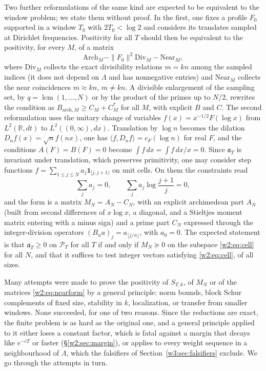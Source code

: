 \documentclass[11pt]{amsart}
\theoremstyle{definition}
\theoremstyle{remark}
\numberwithin{equation}{section}
\newcommand{\R}{\mathbb{R}}
\newcommand{\cF}{c_F}                                  %
\newcommand{\PT}{\mathcal{P}_T}                        %
\newcommand{\aT}{\mathfrak{a}_T}                       %
\begin{document}
Two further reformulations of the same kind are expected to be equivalent to the window problem; we state them without
proof. In the first, one fixes a profile $F_0$ supported in a window $T_0$ with $2T_0<\log2$ and considers its
translates sampled at Dirichlet frequencies. Positivity for all $T$ should then be equivalent to the positivity, for
every $M$, of a matrix
\begin{equation}\label{w2:eq:nearform}
\mathrm{Arch}_M-\|F_0\|^2\mathrm{Div}_M-\mathrm{Near}_M,
\end{equation}
where $\mathrm{Div}_M$ collects the exact divisibility relations $m=kn$ among the sampled indices (it does not depend
on $\Lambda$ and has nonnegative entries) and $\mathrm{Near}_M$ collects the near coincidences $m\approx kn$, $m\ne kn$.
A divisible enlargement of the sampling set, by $q=\operatorname{lcm}(1,\dots,N)$ or by the product of the primes up
to $N/2$, rewrites the condition as $B_{\mathrm{arch},M}\ge C_M+C_M^*$ for all $M$, with explicit $B$ and $C$. The
second reformulation uses the unitary change of variables $f(x)=x^{-1/2}F(\log x)$ from $L^2(\R,dt)$ to
$L^2((0,\infty),dx)$. Translation by $\log n$ becomes the dilation $D_nf(x)=\sqrt nf(nx)$, one has
$\langle f,D_nf\rangle=\cF(\log n)$ for real $F$, and the conditions $A(F)=B(F)=0$ become $\int f\,dx=\int f\,dx/x=0$.
Since $\aT$ is invariant under translation, which preserves primitivity, one may consider step functions
$f=\sum_{1\le j\le N}a_j\mathbf 1_{[j,j+1)}$ on unit cells. On them the constraints read
\begin{equation}\label{w2:eq:cell}
\sum_j a_j=0,\qquad \sum_j a_j\log\frac{j+1}{j}=0,
\end{equation}
and the form is a matrix $M_N=A_N-C_N$, with an explicit archimedean part $A_N$ (built from second differences of
$x\log x$, a diagonal, and a Stieltjes moment matrix entering with a minus sign) and a prime part $C_N$ expressed
through the integer-division operators $(B_na)_j=a_{\lfloor j/n\rfloor}$, with $a_0=0$. The expected statement is that
$\aT\ge0$ on $\PT$ for all $T$ if and only if $M_N\succeq0$ on the subspace \eqref{w2:eq:cell} for all $N$, and that it
suffices to test integer vectors satisfying \eqref{w2:eq:cell}, of all sizes.

Many attempts were made to prove the positivity of $S_{T,k}$, of $M_N$ or of the matrices \eqref{w2:eq:nearform} by a
general principle: norm bounds, block Schur complements of fixed size, stability in $k$, localization, or transfer
from smaller windows. None succeeded, for one of two reasons. Since the reductions are exact, the finite problem is as
hard as the original one, and a general principle applied to it either loses a constant factor, which is fatal against
a margin that decays like $e^{-cT}$ or faster (\S\ref{w2:sec:margin}), or applies to every weight sequence in a
neighbourhood of $\Lambda$, which the falsifiers of Section~\ref{w3:sec:falsifiers} exclude. We go through the
attempts in turn.
\end{document}
